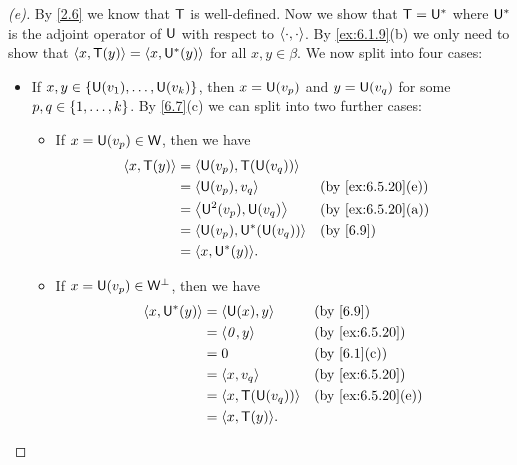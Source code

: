\begin{proof}[(e)]
  By \cref{2.6} we know that \(\mathsf{T}\) is well-defined.
  Now we show that \(\mathsf{T} = \mathsf{U}^*\) where \(\mathsf{U}^*\) is the adjoint operator of \(\mathsf{U}\) with respect to \(\left\langle\cdot, \cdot\right\rangle\).
  By \cref{ex:6.1.9}(b) we only need to show that \(\left\langle x, \mathsf{T}(y)\right\rangle = \left\langle x, \mathsf{U}^*(y)\right\rangle\) for all \(x, y \in \beta\).
  We now split into four cases:
  \begin{itemize}
    \item If \(x, y \in \left\lbrace\mathsf{U}(v_1), \dots, \mathsf{U}(v_k)\right\rbrace\), then \(x = \mathsf{U}(v_p)\) and \(y = \mathsf{U}(v_q)\) for some \(p, q \in \left\lbrace1, \dots, k\right\rbrace\).
          By \cref{6.7}(c) we can split into two further cases:
          \begin{itemize}
            \item If \(x = \mathsf{U}(v_p) \in \mathsf{W}\), then we have
                  \begin{align*}
                    \inn{x, \T(y)} & = \inn{\U(v_p), \T(\U(v_q))}                          \\
                                   & = \inn{\U(v_p), v_q}           &  & \by{ex:6.5.20}[e] \\
                                   & = \inn{\U^2(v_p), \U(v_q)}     &  & \by{ex:6.5.20}[a] \\
                                   & = \inn{\U(v_p), \U^*(\U(v_q))} &  & \by{6.9}          \\
                                   & = \inn{x, \U^*(y)}.
                  \end{align*}
            \item If \(x = \mathsf{U}(v_p) \in \mathsf{W}^{\perp}\), then we have
                  \begin{align*}
                    \inn{x, \U^*(y)} & = \inn{\U(x), y}       &  & \by{6.9}          \\
                                     & = \inn{\zv, y}         &  & \by{ex:6.5.20}    \\
                                     & = 0                    &  & \by{6.1}[c]       \\
                                     & = \inn{x, v_q}         &  & \by{ex:6.5.20}    \\
                                     & = \inn{x, \T(\U(v_q))} &  & \by{ex:6.5.20}[e] \\
                                     & = \inn{x, \T(y)}.
                  \end{align*}
          \end{itemize}

\end{itemize}
\end{proof}
